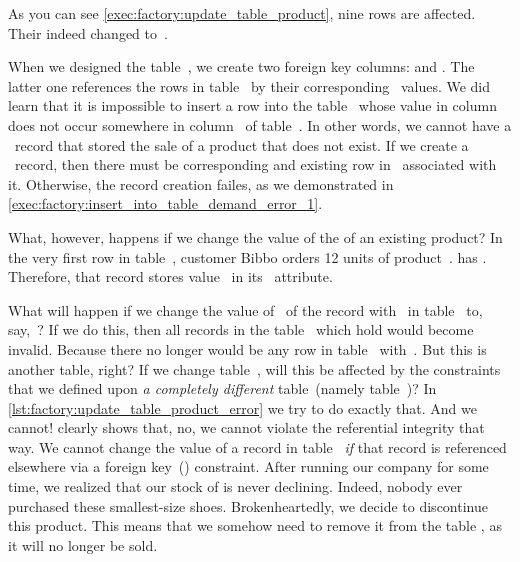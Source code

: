 As you can see \cref{exec:factory:update_table_product}, nine rows are affected.
Their  indeed changed to~.

When we designed the table~, we create two foreign key columns:
 and .
The latter one references the rows in table~ by their corresponding~ values.
We did learn that it is impossible to insert a row into the table~ whose value in column~ does not occur somewhere in column~ of table~.
In other words, we cannot have a ~record that stored the sale of a product that does not exist.
If we create a ~record, then there must be corresponding and existing row in~ associated with it.
Otherwise, the record creation failes, as we demonstrated in \cref{exec:factory:insert_into_table_demand_error_1}.

What, however, happens if we change the value of the  of an existing product?
In the very first row in table~, customer Bibbo orders 12 units of product~.
 has .
Therefore, that  record stores value~ in its ~attribute.

What will happen if we change the value of~ of the record with~ in table~ to, say,~?
If we do this, then all records in the table~ which hold  would become invalid.
Because there no longer would be any row in table~ with~.
But this is another table, right?
If we change table~, will this be affected by the constraints that we defined upon \emph{a completely different} table~(namely table~)?
In \cref{lst:factory:update_table_product_error} we try to do exactly that.
And we cannot!
 clearly shows that, no, we cannot violate the referential integrity that way.
We cannot change the  value of a record in table~ \emph{if} that record is referenced elsewhere via a foreign key~() constraint.%
\endhsection%
%
%
%
%
After running our company for some time, we realized that our stock of  is never declining.
Indeed, nobody ever purchased these smallest-size shoes.
Brokenheartedly, we decide to discontinue this product.
This means that we somehow need to remove it from the table , as it will no longer be sold.

